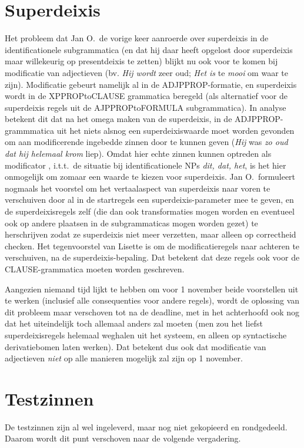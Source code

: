 \section{Superdeixis}
Het probleem dat Jan O.\ de vorige keer aanroerde over superdeixis in de 
identificationele subgrammatica (en dat hij daar heeft opgelost door 
superdeixis maar willekeurig op presentdeixis te zetten) blijkt nu ook voor te 
komen bij modificatie van adjectieven (bv. {\em 
Hij wordt\/} zeer oud; {\em Het is} te {\em mooi\/} om waar te zijn). 
Modificatie 
gebeurt namelijk al in de ADJPPROP-formatie, en superdeixis wordt in de 
XPPROPtoCLAUSE grammatica beregeld (als alternatief voor de superdeixis 
regels uit de AJPPROPtoFORMULA subgrammatica). In analyse betekent dit dat na 
het omega maken van de superdeixis, in de ADJPPROP-grammmatica uit het niets 
alsnog een superdeixiswaarde moet worden gevonden om aan modificerende 
ingebedde zinnen door te kunnen geven ({\em Hij\/} was {\em zo oud dat hij 
helemaal krom\/} liep). Omdat hier echte zinnen kunnen optreden als modificator
, i.t.t.\ de situatie bij identificationele NPs {\em dit, dat, het\/}, is het 
hier onmogelijk om zomaar een waarde te kiezen voor superdeixis. 
Jan O.\ formuleert nogmaals het voorstel om het 
vertaalaspect van superdeixis naar voren te verschuiven door al in de 
startregels een superdeixis-parameter mee te geven, en de superdeixisregels 
zelf (die dan ook transformaties mogen worden en eventueel ook op andere 
plaatsen in de subgrammaticas mogen worden gezet) te herschrijven zodat ze 
superdeixis niet meer verzetten, maar alleen op correctheid checken. Het 
tegenvoorstel van Lisette is om de modificatieregels naar achteren te 
verschuiven, na de superdeixis-bepaling. Dat betekent dat deze regels ook voor 
de CLAUSE-grammatica moeten worden geschreven. 

Aangezien niemand tijd lijkt te hebben om voor 1 november beide voorstellen uit 
te werken (inclusief alle consequenties voor andere regels), wordt de oplossing 
van dit probleem maar verschoven tot na de deadline, met in het achterhoofd ook 
nog dat het uiteindelijk toch allemaal anders zal moeten (men zou het 
liefst superdeixisregels helemaal weghalen uit het systeem, en alleen op 
syntactische derivatiebomen laten werken). Dat betekent dus ook dat modificatie 
van adjectieven {\em niet\/} op alle manieren mogelijk zal zijn op 1 november.

\section{Testzinnen}
De testzinnen zijn al wel ingeleverd, maar nog niet gekopieerd en rondgedeeld. 
Daarom wordt dit punt verschoven naar de volgende vergadering.



